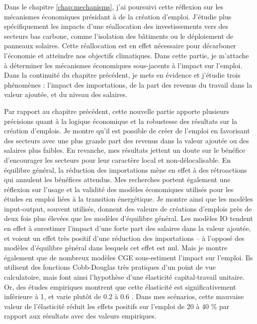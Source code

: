 Dans le chapitre \ref{chap:mechanisms}, j’ai poursuivi cette réflexion sur les mécanismes économiques présidant à de la création d’emploi. J’étudie plus spécifiquement les impacts d’une réallocation des investissements vers des secteurs bas carbone, comme l’isolation des bâtiments ou le déploiement de panneaux solaires.  Cette réallocation est en effet nécessaire pour décarboner l’économie et atteindre nos objectifs climatiques. 
Dans cette partie, je m’attache à déterminer les mécanismes économiques sous-jacents à l’impact sur l’emploi. Dans la continuité du chapitre précédent, je mets en évidence et j’étudie trois phénomènes : l’impact des importations, de la part des revenus du travail dans la valeur ajoutée, et du niveau des salaires.

Par rapport au chapitre précédent, cette nouvelle partie apporte plusieurs précisions quant à la logique économique et la robustesse des résultats sur la création d’emplois. 
Je montre qu’il est possible de créer de l’emploi en favorisant des secteurs avec une plus grande part des revenus dans la valeur ajoutée ou des salaires plus faibles. En revanche, mes résultats jettent un doute sur le bénéfice d’encourager les secteurs pour leur caractère local et non-délocalisable. En équilibre général, la réduction des importations mène en effet à des rétroactions qui annulent les bénéfices attendus.
Mes recherches portent également une réflexion sur l’usage et la validité des modèles économiques utilisés pour les études en emploi liées à la transition énergétique. Je montre ainsi que les modèles input-output, souvent utilisés, donnent des valeurs de créations d’emplois près de deux fois plus élevées que les modèles d’équilibre général. Les modèles IO tendent en effet à surestimer l’impact d’une forte part des salaires dans la valeur ajoutée, et voient un effet très positif d’une réduction des importations – à l’opposé des modèles d’équilibre général dans lesquels cet effet est nul.
Mais je montre également que de nombreux modèles CGE sous-estiment l’impact sur l’emploi. Ils utilisent des fonctions Cobb-Douglas très pratiques d’un point de vue calculatoire, mais font ainsi l’hypothèse d’une élasticité capital-travail unitaire. Or, des études empiriques montrent que cette élasticité est significativement inférieure à 1, et varie plutôt de 0.2 à 0.6 \citep{VanderWerf2008}. Dans mes scénarios, cette mauvaise valeur de l’élasticité réduit les effets positifs sur l’emploi de 20 à 40 \% par rapport aux résultats avec des valeurs empiriques. 

